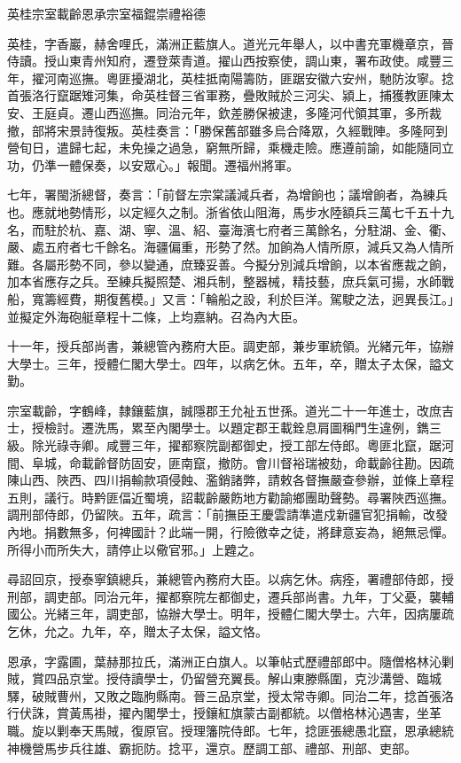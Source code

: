 
\begin{pinyinscope}
英桂宗室載齡恩承宗室福錕崇禮裕德

英桂，字香巖，赫舍哩氏，滿洲正藍旗人。道光元年舉人，以中書充軍機章京，晉侍讀。授山東青州知府，遷登萊青道。擢山西按察使，調山東，署布政使。咸豐三年，擢河南巡撫。粵匪擾湖北，英桂抵南陽籌防，匪踞安徽六安州，馳防汝寧。捻首張洛行竄踞雉河集，命英桂督三省軍務，疊敗賊於三河尖、潁上，捕獲教匪陳太安、王庭貞。遷山西巡撫。同治元年，欽差勝保被逮，多隆河代領其軍，多所裁撤，部將宋景詩復叛。英桂奏言：「勝保舊部雖多烏合降眾，久經戰陣。多隆阿到營旬日，遣歸七起，未免操之過急，窮無所歸，乘機走險。應遵前諭，如能隨同立功，仍準一體保奏，以安眾心。」報聞。遷福州將軍。

七年，署閩浙總督，奏言：「前督左宗棠議減兵者，為增餉也；議增餉者，為練兵也。應就地勢情形，以定經久之制。浙省依山阻海，馬步水陸額兵三萬七千五十九名，而駐於杭、嘉、湖、寧、溫、紹、臺海濱七府者三萬餘名，分駐湖、金、衢、嚴、處五府者七千餘名。海疆偏重，形勢了然。加餉為人情所原，減兵又為人情所難。各屬形勢不同，參以變通，庶臻妥善。今擬分別減兵增餉，以本省應裁之餉，加本省應存之兵。至練兵擬照楚、湘兵制，整器械，精技藝，庶兵氣可揚，水師戰船，寬籌經費，期復舊模。」又言：「輪船之設，利於巨洋。駕駛之法，迥異長江。」並擬定外海砲艇章程十二條，上均嘉納。召為內大臣。

十一年，授兵部尚書，兼總管內務府大臣。調吏部，兼步軍統領。光緒元年，協辦大學士。三年，授體仁閣大學士。四年，以病乞休。五年，卒，贈太子太保，謚文勤。

宗室載齡，字鶴峰，隸鑲藍旗，誠隱郡王允祉五世孫。道光二十一年進士，改庶吉士，授檢討。遷洗馬，累至內閣學士。以題定郡王載銓息肩圖稱門生違例，鐫三級。除光祿寺卿。咸豐三年，擢都察院副都御史，授工部左侍郎。粵匪北竄，踞河間、阜城，命載齡督防固安，匪南竄，撤防。會川督裕瑞被劾，命載齡往勘。因疏陳山西、陜西、四川捐輸款項侵蝕、濫銷諸弊，請敕各督撫嚴查參辦，並條上章程五則，議行。時黔匪偪近蜀境，詔載齡嚴飭地方勸諭鄉團助聲勢。尋署陜西巡撫。調刑部侍郎，仍留陜。五年，疏言：「前撫臣王慶雲請準遣戍新疆官犯捐輸，改發內地。捐數無多，何裨國計？此端一開，行險徼幸之徒，將肆意妄為，絕無忌憚。所得小而所失大，請停止以儆官邪。」上韙之。

尋詔回京，授泰寧鎮總兵，兼總管內務府大臣。以病乞休。病痊，署禮部侍郎，授刑部，調吏部。同治元年，擢都察院左都御史，遷兵部尚書。九年，丁父憂，襲輔國公。光緒三年，調吏部，協辦大學士。明年，授體仁閣大學士。六年，因病屢疏乞休，允之。九年，卒，贈太子太保，謚文恪。

恩承，字露圃，葉赫那拉氏，滿洲正白旗人。以筆帖式歷禮部郎中。隨僧格林沁剿賊，賞四品京堂。授侍讀學士，仍留營充翼長。解山東滕縣圍，克沙溝營、臨城驛，破賊曹州，又敗之臨朐縣南。晉三品京堂，授太常寺卿。同治二年，捻首張洛行伏誅，賞黃馬褂，擢內閣學士，授鑲紅旗蒙古副都統。以僧格林沁遇害，坐革職。旋以剿奉天馬賊，復原官。授理籓院侍郎。七年，捻匪張總愚北竄，恩承總統神機營馬步兵往雄、霸扼防。捻平，還京。歷調工部、禮部、刑部、吏部。


\end{pinyinscope}
